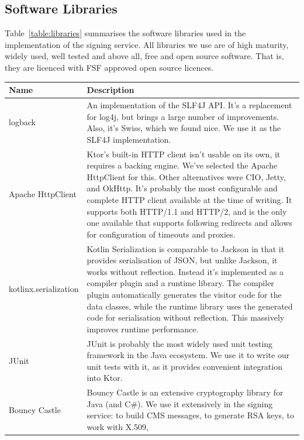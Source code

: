 \subsection{Software Libraries}\label{subsec:software-libraries}
Table~\ref{table:libraries} summarises the software libraries used in the implementation of the signing service.
All libraries we use are of high maturity, widely used, well tested and above all,
free and open source software.
That is, they are licenced with \gls{FSF} approved open source licences.

\begin{longtable}{p{3cm}p{12cm}}
    \hline
    \textbf{Name} & \textbf{Description} \\ \hline
    logback &
    An implementation of the \gls{SLF4J} \gls{API}.
    It's a replacement for log4j, but brings a large number of improvements.
    Also, it's Swiss, which we found nice.
    We use it as the \gls{SLF4J} implementation.
    \\ \hline
    Apache HttpClient &
    Ktor's built-in \gls{HTTP} client isn't usable on its own,
    it requires a backing engine.
    We've selected the Apache HttpClient for this.
    Other alternatives were \gls{CIO}, Jetty, and OkHttp.
    It's probably the most configurable and complete \gls{HTTP} client available at the time of writing. It supports both \gls{HTTP}/1.1 and \gls{HTTP}/2,
    and is the only one available that supports following redirects and allows for configuration of timeouts and proxies.
    \\ \hline
    kotlinx.serialization &
    Kotlin Serialization is comparable to Jackson in that it provides serialisation of \gls{JSON},
    but unlike Jackson,
    it works without reflection.
    Instead it's implemented as a compiler plugin and a runtime library.
    The compiler plugin automatically generates the visitor code for the data classes,
    while the runtime library uses the generated code for serialisation without reflection.
    This massively improves runtime performance.
    \\ \hline
    JUnit &
    JUnit is probably the most widely used unit testing framework in the Java ecosystem.
    We use it to write our unit tests with it,
    as it provides convenient integration into Ktor.
    \\ \hline
    Bouncy Castle &
    Bouncy Castle is an extensive cryptography library for Java (and C\#).
    We use it extensively in the signing service:
    to build \gls{CMS} messages,
    to generate \gls{RSA} keys,
    to work with X.509,

\end{longtable}
